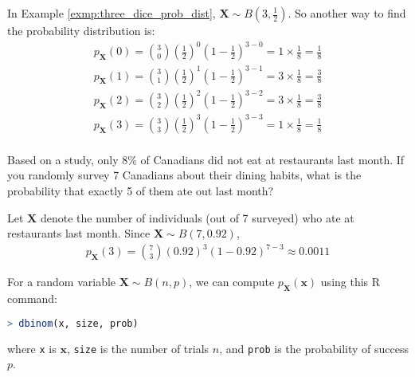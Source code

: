\begin{exmp}
    In Example \autoref{exmp:three_dice_prob_dist}, \( \bm{X} \sim B(3, \frac{1}{2}) \).
    So another way to find the probability distribution is:
    \begin{gather*}
        p_{\bm{X}}(0) = \binom{3}{0} (\frac{1}{2})^0 (1 - \frac{1}{2})^{3 - 0} = 1 \times \frac{1}{8} = \frac{1}{8}\\
        p_{\bm{X}}(1) = \binom{3}{1} (\frac{1}{2})^1 (1 - \frac{1}{2})^{3 - 1} = 3 \times \frac{1}{8} = \frac{3}{8}\\
        p_{\bm{X}}(2) = \binom{3}{2} (\frac{1}{2})^2 (1 - \frac{1}{2})^{3 - 2} = 3 \times \frac{1}{8} = \frac{3}{8}\\
        p_{\bm{X}}(3) = \binom{3}{3} (\frac{1}{2})^3 (1 - \frac{1}{2})^{3 - 3} = 1 \times \frac{1}{8} = \frac{1}{8}\\
    \end{gather*}
\end{exmp}
\begin{exmp}
    Based on a study, only 8\% of Canadians did not eat at restaurants last month.
    If you randomly survey 7 Canadians about their dining habits,
    what is the probability that exactly 5 of them ate out last month?
\end{exmp}
\begin{solution}
    Let \( \bm{X} \) denote the number of individuals (out of 7 surveyed) who ate at restaurants last month.
    Since \( \bm{X} \sim B(7, 0.92) \),
    \begin{gather*}
        p_{\bm{X}}(3) = \binom{7}{3} (0.92)^3 (1 - 0.92)^{7 - 3} \approx 0.0011
    \end{gather*}
\end{solution}
For a random variable \( \bm{X} \sim B(n, p) \), we can compute \( p_{\bm{X}}(\bm{x}) \) using this R command:
\begin{lstlisting}[language=R]
> dbinom(x, size, prob)
\end{lstlisting}
where \verb|x| is \( \bm{x} \), \verb|size| is the number of trials \( n \), and \verb|prob| is the probability of success \( p \).


